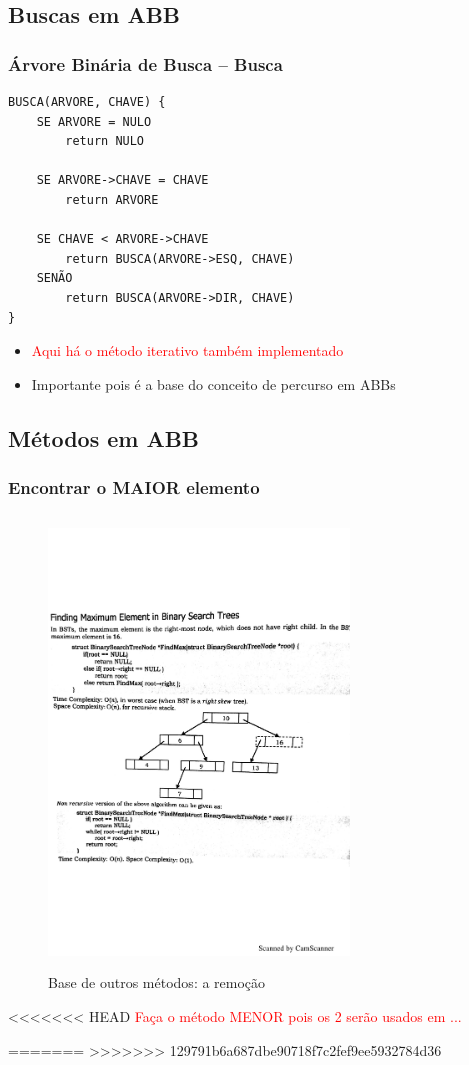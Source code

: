 \subsection{Buscas em ABB}
\begin{frame}[fragile]
\frametitle{Árvore Binária de Busca -- Busca}
\begin{verbatim}
BUSCA(ARVORE, CHAVE) {
    SE ARVORE = NULO
        return NULO
        
    SE ARVORE->CHAVE = CHAVE
        return ARVORE 
    
    SE CHAVE < ARVORE->CHAVE
        return BUSCA(ARVORE->ESQ, CHAVE)
    SENÃO
        return BUSCA(ARVORE->DIR, CHAVE)
}
\end{verbatim}
\begin{itemize}
  \item \textcolor{red}{Aqui há o método iterativo também implementado}
  \item Importante pois é a base  do conceito de percurso em ABBs
\end{itemize}

\end{frame}

\subsection{Métodos em ABB}

\begin{frame}
  \frametitle{Encontrar o MAIOR elemento}
\vspace{-2cm}
 \begin{figure}[!ht]
    \centering
    \includegraphics[width=8cm, height=12cm]{figs/fig_arvores/maior_elemento_ABB.pdf}
    \caption{Base de outros métodos: a remoção}
    \end{figure}


<<<<<<< HEAD
\textcolor{red}{Faça o método MENOR pois os 2 serão usados em ...}

=======
>>>>>>> 129791b6a687dbe90718f7c2fef9ee5932784d36
\end{frame}




